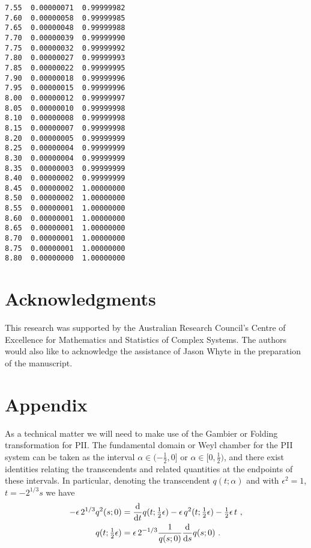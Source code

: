 \documentclass[10pt,reqno]{amsart}
\theoremstyle{plain}
\theoremstyle{definition}
\theoremstyle{remark}
\begin{document}
\begin{table}[tbp]
{\begin{minipage}{0.3\textwidth}
\begin{verbatim}
7.55  0.00000071  0.99999982
7.60  0.00000058  0.99999985
7.65  0.00000048  0.99999988
7.70  0.00000039  0.99999990
7.75  0.00000032  0.99999992
7.80  0.00000027  0.99999993
7.85  0.00000022  0.99999995
7.90  0.00000018  0.99999996
7.95  0.00000015  0.99999996
8.00  0.00000012  0.99999997
8.05  0.00000010  0.99999998
8.10  0.00000008  0.99999998
8.15  0.00000007  0.99999998
8.20  0.00000005  0.99999999
8.25  0.00000004  0.99999999
8.30  0.00000004  0.99999999
8.35  0.00000003  0.99999999
8.40  0.00000002  0.99999999
8.45  0.00000002  1.00000000
8.50  0.00000002  1.00000000
8.55  0.00000001  1.00000000
8.60  0.00000001  1.00000000
8.65  0.00000001  1.00000000
8.70  0.00000001  1.00000000
8.75  0.00000001  1.00000000
8.80  0.00000000  1.00000000
\end{verbatim}
\end{minipage}}
\end{table}

\section*{Acknowledgments}
This research was supported by the Australian Research Council's Centre of Excellence for Mathematics
and Statistics of Complex Systems. The authors would also like
to acknowledge the assistance of Jason Whyte in the preparation of the manuscript.

\appendix

\section*{Appendix}   
\setcounter{section}{1}
\setcounter{equation}{0}

As a technical matter we will need to make use of the Gambier or Folding transformation
for PII. The fundamental domain or Weyl chamber for the PII system can be taken as the interval
$ \alpha \in (-{\tfrac{1}{2}},0] $ or $ \alpha \in [0,{\tfrac{1}{2}}) $, and there exist identities relating the 
transcendents and related quantities at the endpoints of these intervals. In particular, denoting 
the transcendent $ q(t;\alpha) $ and with $ \epsilon^2 = 1 $, $ t = -2^{1/3}s $ we have 
\cite{Gromak_1999}
\begin{equation}
\begin{split}
   -\epsilon\, 2^{1/3} q^2(s;0)
   & = \frac{{\rm d}}{{\rm d}t}q(t;{\tfrac{1}{2}}\epsilon) - \epsilon\, q^2(t;{\tfrac{1}{2}}\epsilon) 
	- {\tfrac{1}{2}}\epsilon\, t \ ,\\
   q(t;{\tfrac{1}{2}}\epsilon) & =
   \epsilon\, 2^{-1/3} \frac{1}{q(s;0)} \frac{{\rm d}}{{\rm d}s}q(s;0) \ .
\end{split}
\label{PII-ends}
\end{equation}
\end{document}
